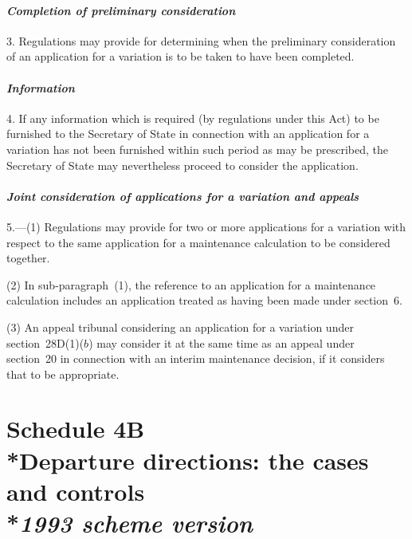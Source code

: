 \documentclass[12pt,a4paper]{article}
\begin{document}
\subsection*{\itshape Completion of preliminary consideration}

3. Regulations may provide for determining when the preliminary consideration of an application for a variation is to be taken to have been completed.

\subsection*{\itshape Information}

4. If any information which is required (by regulations under this Act) to be furnished to the Secretary of State in connection with an application for a variation has not been furnished within such period as may be prescribed, the Secretary of State may nevertheless proceed to consider the application.

\subsection*{\itshape Joint consideration of applications for a variation and appeals}

5.---(1) Regulations may provide for two or more applications for a variation with respect to the same application for a maintenance calculation to be considered together.

(2) In sub-paragraph~(1), the reference to an application for a maintenance calculation includes an application treated as having been made under section~6. 

(3) An appeal tribunal considering an application for a variation under section~28D(1)($b$)  may consider it at the same time as an appeal under section~20 in connection with an interim maintenance decision, if it considers that to be appropriate.

\part[Schedule 4B --- Departure directions: the cases and controls --- \emph{1993 scheme version}]{Schedule 4B\\*Departure directions: the cases and controls\\*\emph{1993 scheme version}}

\end{document}
